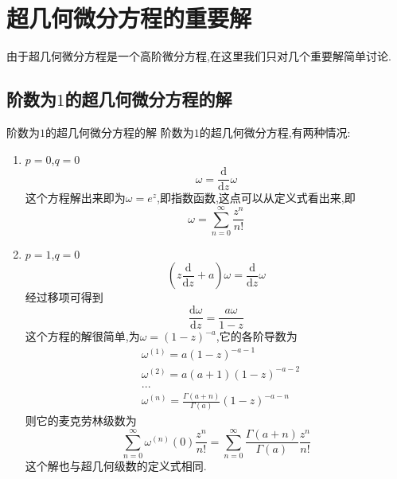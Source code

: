 \documentclass[zihao=-4,a4paper]{ctexart}
\begin{document}
\section{超几何微分方程的重要解}
由于超几何微分方程是一个高阶微分方程,在这里我们只对几个重要解简单讨论.

\subsection{阶数为$1$的超几何微分方程的解}
\begin{mproof}{阶数为$1$的超几何微分方程的解}
	阶数为$1$的超几何微分方程,有两种情况:

	\begin{enumerate}
		\item $p=0$,$q=0$
		\begin{equation}
			{\omega} = \frac{ \text{d} }{ \text{d} {z} } {\omega}
		\end{equation}
		这个方程解出来即为${\omega} = {e}^{z}$,即指数函数,这点可以从定义式看出来,即
		\begin{equation*}
			{\omega} = \sum^{\infty}_{ n = 0 } \frac{ {z}^{n} }{ n ! }
		\end{equation*}

		\item $p=1$,$q=0$
		\begin{equation*}
			\left( {z} \frac{ \text{d} }{ \text{d} {z} } + {a} \right) {\omega} = \frac{ \text{d} }{ \text{d} {z} } {\omega}
		\end{equation*}
		经过移项可得到
		\begin{equation}
			\frac{ \text{d} {\omega} }{ \text{d} {z} } = \frac{ {a} {\omega} }{ {1} - {z} }
		\end{equation}
		这个方程的解很简单,为$ {\omega} = { \left( 1 - {z} \right) }^{ -a }$,它的各阶导数为
		\begin{equation*}
			\begin{split}
				&{\omega}^{ \left( {1} \right) } = a { \left( {1} - {z} \right)}^{ - {a} - 1 }\\
				&{\omega}^{ \left( {2} \right) } = a \left( {a} + {1} \right) { \left( {1} - {z} \right)}^{ - {a} - 2 }\\
				&...\\
				&{\omega}^{ \left( {n} \right) } = \frac{ {\Gamma} \left( {a} + {n} \right) }{ {\Gamma} \left( {a} \right) } { \left( {1} - {z} \right)}^{ - {a} - n }
			\end{split}
		\end{equation*}
		则它的麦克劳林级数为
		\begin{equation*}
			\sum^{\infty}_{n = 0} {\omega}^{ \left( {n} \right) } \left( {0} \right) \frac{ {z}^{n} }{ {n} !} = \sum^{\infty}_{ n = 0 } \frac{ {\Gamma} \left( {a} + {n} \right) }{ {\Gamma} \left( {a} \right) } \frac{ {z}^{n} }{ n ! }
		\end{equation*}
		这个解也与超几何级数的定义式相同.


\end{enumerate}
\end{mproof}
\end{document}
